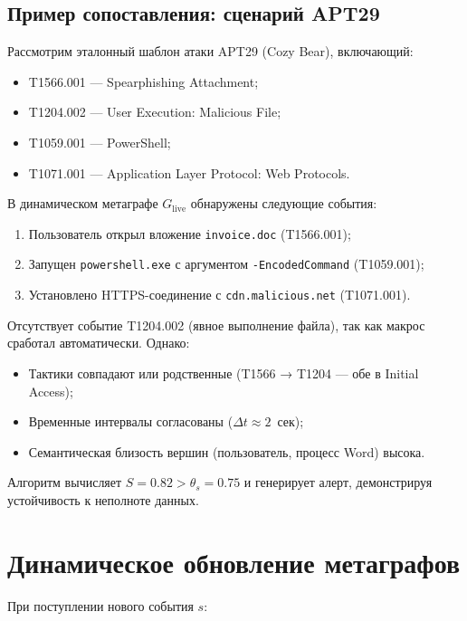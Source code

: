 \documentclass{article}
\begin{document}
\subsection{Пример сопоставления: сценарий APT29}

Рассмотрим эталонный шаблон атаки APT29 (Cozy Bear), включающий:
\begin{itemize}
    \item T1566.001 — Spearphishing Attachment;
    \item T1204.002 — User Execution: Malicious File;
    \item T1059.001 — PowerShell;
    \item T1071.001 — Application Layer Protocol: Web Protocols.
\end{itemize}

В динамическом метаграфе $G_{\text{live}}$ обнаружены следующие события:
\begin{enumerate}
    \item Пользователь открыл вложение \texttt{invoice.doc} (T1566.001);
    \item Запущен \texttt{powershell.exe} с аргументом \texttt{-EncodedCommand} (T1059.001);
    \item Установлено HTTPS-соединение с \texttt{cdn.malicious.net} (T1071.001).
\end{enumerate}

Отсутствует событие T1204.002 (явное выполнение файла), так как макрос сработал автоматически. Однако:
\begin{itemize}
    \item Тактики совпадают или родственные (T1566 → T1204 — обе в Initial Access);
    \item Временные интервалы согласованы ($\Delta t \approx 2$~сек);
    \item Семантическая близость вершин (пользователь, процесс Word) высока.
\end{itemize}

Алгоритм вычисляет $S = 0.82 > \theta_s = 0.75$ и генерирует алерт, демонстрируя устойчивость к неполноте данных.

\section{Динамическое обновление метаграфов}\label{sec:ch3/sect4}

При поступлении нового события $s$:
\end{document}
